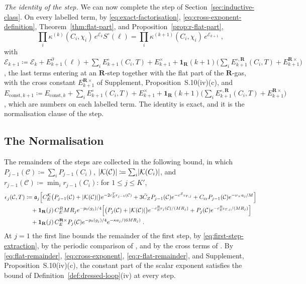 \documentclass[11pt]{preprint}
\DeclarePairedDelimiter{\abs}{\lvert}{\rvert}
\numberwithin{equation}{section}
\theoremstyle{definition}
\theoremstyle{remark}
\theoremstyle{plain}
\begin{document}
\emph{The identity of the step.} We can now complete the step of Section~\ref{sec:inductive-class}. On every labelled term, by \eqref{eq:exact-factorisation}, \eqref{eq:cross-exponent-definition}, Theorem~\ref{thm:flat-part}, and Proposition~\ref{prop:r-flat-part},
\begin{equation}\label{eq:step-identity}
    \prod_i\kappa^{(k)}(C_i, \chi_i)\,e^{\mathcal E_k}S^\circ(\ell) = \prod_i\kappa^{(k+1)}(C_i, \chi_i)\,e^{\mathcal E_{k+1}}\;,
\end{equation}
with $\mathcal E_{k+1} \coloneqq \mathcal E_k + E^\partial_{k+1}(\ell) + \sum_iE^\circ_{k+1}(C_i, T) + E^\times_{k+1} + \mathbf 1_{\mathbf R}(k + 1)\bigl(\sum_iE^{\circ,\mathbf R}_{k+1}(C_i, T) + E^{\mathbf R\times}_{k+1}\bigr)$, the last terms entering at an $\mathbf R$-step together with the flat part of the $\mathbf R$-gas, with the cross constant $E^{\mathbf R\times}_{k+1}$ of Supplement, Proposition~S.10(iv)(c), and $E_{\mathrm{const},k+1} \coloneqq E_{\mathrm{const},k} + \sum_iE^\circ_{k+1}(C_i, T) + E^\times_{k+1} + \mathbf 1_{\mathbf R}(k + 1)\bigl(\sum_iE^{\circ,\mathbf R}_{k+1}(C_i, T) + E^{\mathbf R\times}_{k+1}\bigr)$, which are numbers on each labelled term. The identity is exact, and it is the normalisation clause of the step.

\subsection{The Normalisation}\label{sec:normalisation}

The remainders of the steps are collected in the following bound, in which $P_{j-1}(\mathcal C) \coloneqq \sum_iP_{j-1}(C_i)$, $\abs{\mathcal K(\mathcal C)} \coloneqq \sum_i\abs{\mathcal K(C_i)}$, and $r_{j-1}(\mathcal C) \coloneqq \min_ir_{j-1}(C_i)$: for $1 \leq j \leq K'$,
\begin{equation}\label{eq:step-remainder}
\begin{split}
    \epsilon_j(\mathcal C, T) &\coloneqq \mathfrak a_j\Bigl[C^{\mathcal K}_E\bigl(P_{j-1}(\mathcal C) + \abs{\mathcal K(\mathcal C)}\bigr)e^{-2c^T_Er_{j-1}(\mathcal C)} + 3\bar C_ZP_{j-1}(\mathcal C)e^{-c^Z\iota_{T,j}} + C_{\mathrm{cr}}P_{j-1}(\mathcal C)e^{-\nu_\times a_j/M}\Bigr]\\
    &\quad + \mathbf 1_{\mathbf R}(j)\,C^R_EMR_je^{-p_0(g_j)/4}\Bigl[\bigl(P_j(\mathcal C) + \abs{\mathcal K(\mathcal C)}\bigr)e^{-c^R_Er_j(\mathcal C)/(MR_j)} + P_j(\mathcal C)e^{-c^R_E\iota_{T,j}/(MR_j)}\Bigr]\\
    &\quad + \mathbf 1_{\mathbf R}(j)\,C^{\mathbf R\times}_EP_j(\mathcal C)e^{-p_0(g_j)/4}e^{-\kappa a_j/(6MR_j)}\;.
\end{split}
\end{equation}
At $j = 1$ the first line bounds the remainder of the first step, by \eqref{eq:first-step-extraction}, by the periodic comparison of \cite[Appendix~F]{WilsonFirstStep}, and by the cross terms of \cite[Section~10]{WilsonFirstStep}. By \eqref{eq:flat-remainder}, \eqref{eq:cross-exponent}, \eqref{eq:r-flat-remainder}, and Supplement, Proposition~S.10(iv)(c), the constant part of the scalar exponent satisfies the bound of Definition~\ref{def:dressed-loop}(iv) at every step.
\end{document}
